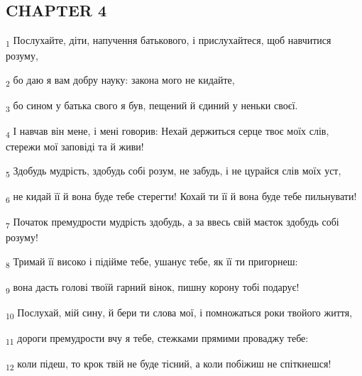 \subsection{CHAPTER 4}
\begin{tcolorbox}
\textsubscript{1} Послухайте, діти, напучення батькового, і прислухайтеся, щоб навчитися розуму,
\end{tcolorbox}
\begin{tcolorbox}
\textsubscript{2} бо даю я вам добру науку: закона мого не кидайте,
\end{tcolorbox}
\begin{tcolorbox}
\textsubscript{3} бо сином у батька свого я був, пещений й єдиний у неньки своєї.
\end{tcolorbox}
\begin{tcolorbox}
\textsubscript{4} І навчав він мене, і мені говорив: Нехай держиться серце твоє моїх слів, стережи мої заповіді та й живи!
\end{tcolorbox}
\begin{tcolorbox}
\textsubscript{5} Здобудь мудрість, здобудь собі розум, не забудь, і не цурайся слів моїх уст,
\end{tcolorbox}
\begin{tcolorbox}
\textsubscript{6} не кидай її й вона буде тебе стерегти! Кохай ти її й вона буде тебе пильнувати!
\end{tcolorbox}
\begin{tcolorbox}
\textsubscript{7} Початок премудрости мудрість здобудь, а за ввесь свій маєток здобудь собі розуму!
\end{tcolorbox}
\begin{tcolorbox}
\textsubscript{8} Тримай її високо і підійме тебе, ушанує тебе, як її ти пригорнеш:
\end{tcolorbox}
\begin{tcolorbox}
\textsubscript{9} вона дасть голові твоїй гарний вінок, пишну корону тобі подарує!
\end{tcolorbox}
\begin{tcolorbox}
\textsubscript{10} Послухай, мій сину, й бери ти слова мої, і помножаться роки твойого життя,
\end{tcolorbox}
\begin{tcolorbox}
\textsubscript{11} дороги премудрости вчу я тебе, стежками прямими проваджу тебе:
\end{tcolorbox}
\begin{tcolorbox}
\textsubscript{12} коли підеш, то крок твій не буде тісний, а коли побіжиш не спіткнешся!
\end{tcolorbox}
